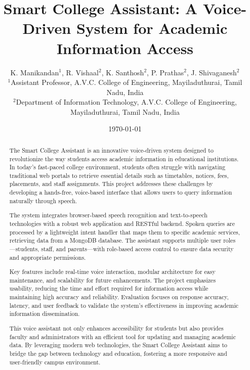 \documentclass{article}
\begin{document}
\title{Smart College Assistant: A Voice-Driven System for Academic Information Access}
\author{K. Manikandan$^{1}$, R. Vishaal$^{2}$, K. Santhosh$^{2}$, P. Prathas$^{2}$, J. Shivaganesh$^{2}$ \\
$^{1}$Assistant Professor, A.V.C. College of Engineering, Mayiladuthurai, Tamil Nadu, India \\
$^{2}$Department of Information Technology, A.V.C. College of Engineering, Mayiladuthurai, Tamil Nadu, India}
\date{\today}
\maketitle

\begin{abstract}
The Smart College Assistant is an innovative voice-driven system designed to revolutionize the way students access academic information in educational institutions. In today's fast-paced college environment, students often struggle with navigating traditional web portals to retrieve essential details such as timetables, notices, fees, placements, and staff assignments. This project addresses these challenges by developing a hands-free, voice-based interface that allows users to query information naturally through speech.

The system integrates browser-based speech recognition and text-to-speech technologies with a robust web application and RESTful backend. Spoken queries are processed by a lightweight intent handler that maps them to specific academic services, retrieving data from a MongoDB database. The assistant supports multiple user roles—students, staff, and parents—with role-based access control to ensure data security and appropriate permissions.

Key features include real-time voice interaction, modular architecture for easy maintenance, and scalability for future enhancements. The project emphasizes usability, reducing the time and effort required for information access while maintaining high accuracy and reliability. Evaluation focuses on response accuracy, latency, and user feedback to validate the system's effectiveness in improving academic information dissemination.

This voice assistant not only enhances accessibility for students but also provides faculty and administrators with an efficient tool for updating and managing academic data. By leveraging modern web technologies, the Smart College Assistant aims to bridge the gap between technology and education, fostering a more responsive and user-friendly campus environment.
\end{abstract}
\end{document}
